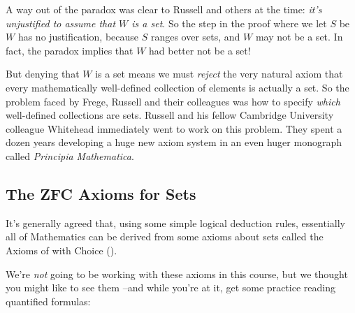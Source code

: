 
A way out of the paradox was clear to Russell and others at the time:
\emph{it's unjustified to assume that $W$ is a set}.  So the step in the
proof where we let $S$ be $W$ has no justification, because $S$ ranges
over sets, and $W$ may not be a set.  In fact, the paradox implies that
$W$ had better not be a set!

But denying that $W$ is a set means we must \emph{reject} the very natural
axiom that every mathematically well-defined collection of elements is
actually a set.  So the problem faced by Frege, Russell and their
colleagues was how to specify \emph{which} well-defined collections are
sets.  Russell and his fellow Cambridge University colleague Whitehead
immediately went to work on this problem.  They spent a dozen years
developing a huge new axiom system in an even huger monograph called
\emph{Principia Mathematica}.


\subsection{The ZFC Axioms for Sets}
It's generally agreed that, using some simple logical deduction rules,
essentially all of Mathematics can be derived from some axioms about sets
called the Axioms of  with Choice ().

We're \emph{not} going to be working with these axioms in this course,
but we thought you might like to see them --and while you're at it, get
some practice reading quantified formulas:
%

